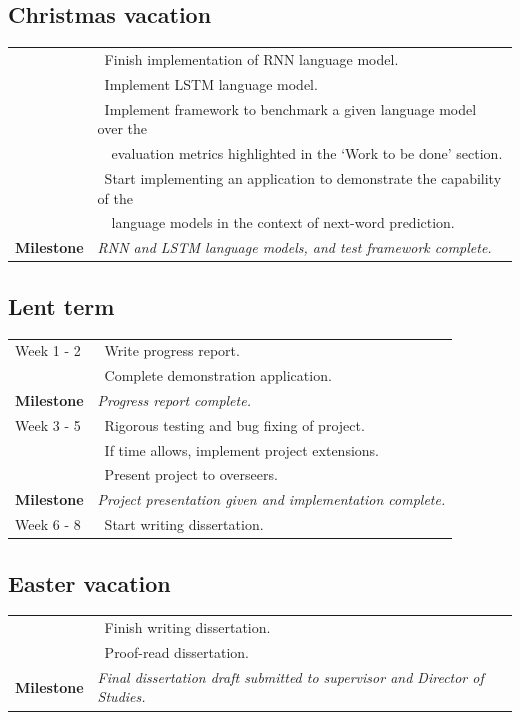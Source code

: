 \documentclass[a4paper, 12pt]{article}
\newcommand{\tbf}[1]{\textbf{#1}}
\newcommand{\tit}[1]{\textit{#1}}
\newcommand{\bpt}[0]{\textbullet~}
\begin{document}
\subsection*{Christmas vacation}
\begin{tabular}{l | l}
	& \bpt Finish implementation of RNN language model. \\
	& \bpt Implement LSTM language model. \\
	& \bpt Implement framework to benchmark a given language model over the \\
	&~~evaluation metrics highlighted in the `Work to be done' section. \\
	& \bpt Start implementing an application to demonstrate the capability of the \\
	&~~language models in the context of next-word prediction. \\
	\tbf{Milestone} & \tit{RNN and LSTM language models, and test framework complete.} \\
\end{tabular}

\subsection*{Lent term}
\begin{tabular}{l | l}
	Week 1 - 2 & \bpt Write progress report. \\
	& \bpt Complete demonstration application. \\
	\tbf{Milestone} & \tit{Progress report complete.} \\ \hline
	Week 3 - 5 & \bpt Rigorous testing and bug fixing of project. \\
	& \bpt If time allows, implement project extensions. \\
	& \bpt Present project to overseers. \\
	\tbf{Milestone} & \tit{Project presentation given and implementation complete.} \\ \hline
	Week 6 - 8 & \bpt Start writing dissertation. \\
\end{tabular}

\subsection*{Easter vacation}
\begin{tabular}{l | l}
	& \bpt Finish writing dissertation. \\
	& \bpt Proof-read dissertation. \\
	\tbf{Milestone} & \tit{Final dissertation draft submitted to supervisor and Director of Studies.} \\
\end{tabular}
\end{document}
